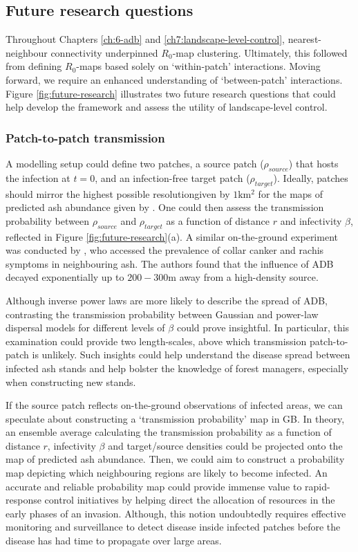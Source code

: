 \subsection{Future research questions}
\label{sec:future-questions}
Throughout Chapters \ref{ch:6-adb} and \ref{ch7:landscape-level-control}, nearest-neighbour connectivity underpinned $R_0$-map clustering.
Ultimately, this followed from defining $R_0$-maps based solely on `within-patch' interactions. Moving forward, we require an enhanced understanding of `between-patch' interactions.
Figure \ref{fig:future-research} illustrates two future research questions that could help develop the framework and assess the utility of landscape-level control.

\subsubsection{Patch-to-patch transmission}
A modelling setup could define two patches, a source patch ($\rho_{source}$) that hosts the infection at $t=0$, and an infection-free target patch ($\rho_{target}$). Ideally, patches should mirror the highest possible resolution\textemdash given by $1\mathrm{km^2}$ for the maps of predicted ash abundance given by \cite{hill.data}.
One could then assess the transmission probability between $\rho_{source}$ and $\rho_{target}$ as a function of distance $r$ and infectivity $\beta$, reflected in Figure \ref{fig:future-research}(a). 
A similar on-the-ground experiment was conducted by \cite{https://doi.org/10.1111/1365-2745.13383},
who accessed the prevalence of collar canker and rachis symptoms in neighbouring ash. 
The authors found that the influence of ADB decayed exponentially up to $200-300\mathrm{m}$ away from a high-density source.

Although inverse power laws are more likely to describe the spread of ADB, contrasting the transmission probability between Gaussian and power-law dispersal models for different levels of $\beta$ could prove insightful. In particular, this examination could provide two length-scales, above which transmission patch-to-patch is unlikely.  Such insights could help understand the disease spread between infected ash stands and help bolster the knowledge of forest managers, especially when constructing new stands.

If the source patch reflects on-the-ground observations of infected areas, we can speculate about constructing a `transmission probability' map in GB. In theory, an ensemble average calculating the transmission probability as a function of distance $r$, infectivity $\beta$ and target/source densities could be projected onto the map of predicted ash abundance.
Then, we could aim to construct a probability map depicting which neighbouring regions are likely to become infected. An accurate and reliable probability map could provide immense value to rapid-response control initiatives by helping direct the allocation of resources in the early phases of an invasion. 
Although, this notion undoubtedly requires effective monitoring and surveillance to detect disease inside infected patches before the disease has had time to propagate over large areas.

